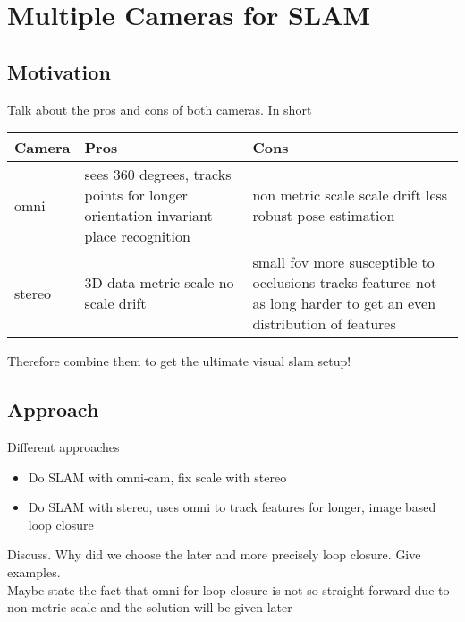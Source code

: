 \chapter{Multiple Cameras for SLAM}
\label{chapter:MultiCamSLAM}

\section{Motivation}

Talk about the pros and cons of both cameras.  In short

\begin{center}
 \begin{tabular}{ | l | p{5.5cm} | p{5.5cm} | }
  \hline
  \bf Camera & \bf Pros & \bf Cons \\ \hline
  omni 
  & sees 360 degrees, \newline 
  tracks points for longer \newline
  orientation invariant place recognition
  & non metric scale \newline 
  scale drift \newline less robust pose estimation\\ \hline
  
  stereo 
  & 3D data \newline metric scale \newline no scale drift
  & small fov \newline
  more susceptible to occlusions \newline 
  tracks features not as long \newline 
  harder to get an even distribution of features \\ \hline
 \end{tabular}

\end{center}


Therefore combine them to get the ultimate visual slam setup!

\section{Approach}

Different approaches
\begin{itemize}
 \item Do SLAM with omni-cam, fix scale with stereo
 \item Do SLAM with stereo, uses omni to track features for longer, image based loop closure
\end{itemize}

Discuss.  Why did we choose the later and more precisely loop closure.
Give examples.
\\

Maybe state the fact that omni for loop closure is not so straight forward due to non metric scale and the solution will be given later